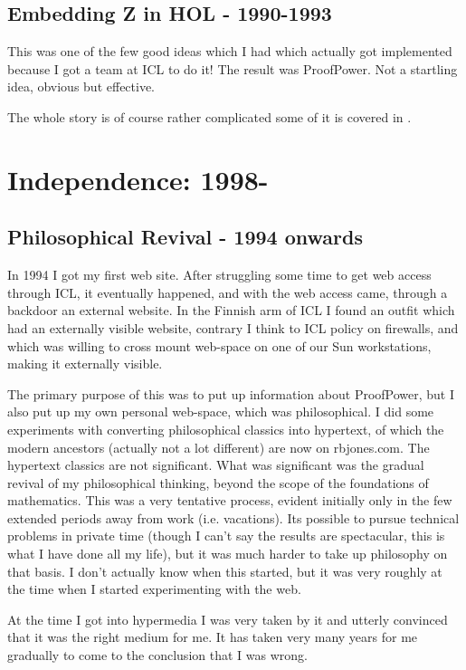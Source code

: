 \documentclass[10pt,titlepage]{book}
\begin{document}
\section{Embedding Z in HOL - 1990-1993}

This was one of the few good ideas which I had which actually got implemented because I got a team at ICL to do it!
The result was ProofPower.
Not a startling idea, obvious but effective.

The whole story is of course rather complicated some of it is covered in \cite{rbjt014, rbjt015}.

\chapter{Independence: 1998-}

\section{Philosophical Revival - 1994 onwards}

In 1994 I got my first web site.
After struggling some time to get web access through ICL, it eventually happened, and with the web access came, through a backdoor an external website.
In the Finnish arm of ICL I found an outfit which had an externally visible website, contrary I think to ICL policy on firewalls, and which was willing to cross mount web-space on one of our Sun workstations, making it externally visible.

The primary purpose of this was to put up information about ProofPower, but I also put up my own personal web-space, which was philosophical.
I did some experiments with converting philosophical classics into hypertext, of which the modern ancestors (actually not a lot different) are now on rbjones.com.
The hypertext classics are not significant.
What was significant was the gradual revival of my philosophical thinking, beyond the scope of the foundations of mathematics.
This was a very tentative process, evident initially only in the few extended periods away from work (i.e. vacations).
Its possible to pursue technical problems in private time (though I can't say the results are spectacular, this is what I have done all my life), but it was much harder to take up philosophy on that basis.
I don't actually know when this started, but it was very roughly at the time when I started experimenting with the web.

At the time I got into hypermedia I was very taken by it and utterly convinced that it was the right medium for me.
It has taken very many years for me gradually to come to the conclusion that I was wrong.
\end{document}
